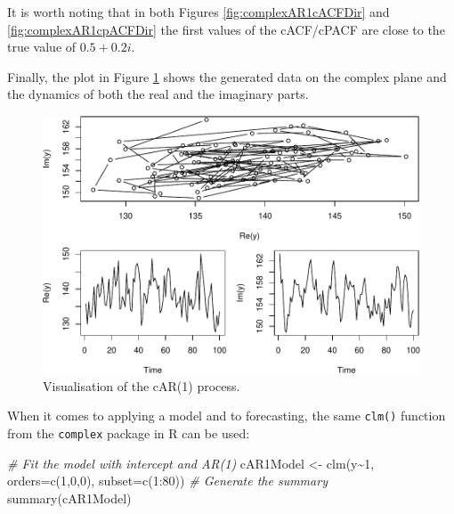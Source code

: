 \documentclass[
]{book}
\newenvironment{Shaded}{\begin{snugshade}}{\end{snugshade}}
\newcommand{\AttributeTok}[1]{\textcolor[rgb]{0.77,0.63,0.00}{#1}}
\newcommand{\CommentTok}[1]{\textcolor[rgb]{0.56,0.35,0.01}{\textit{#1}}}
\newcommand{\DecValTok}[1]{\textcolor[rgb]{0.00,0.00,0.81}{#1}}
\newcommand{\FunctionTok}[1]{\textcolor[rgb]{0.00,0.00,0.00}{#1}}
\newcommand{\NormalTok}[1]{#1}
\newcommand{\OtherTok}[1]{\textcolor[rgb]{0.56,0.35,0.01}{#1}}
\newcommand{\SpecialCharTok}[1]{\textcolor[rgb]{0.00,0.00,0.00}{#1}}
\begin{document}
It is worth noting that in both Figures \ref{fig:complexAR1cACFDir} and \ref{fig:complexAR1cpACFDir} the first values of the cACF/cPACF are close to the true value of \(0.5+0.2i\).

Finally, the plot in Figure \ref{fig:complexAR1Plot} shows the generated data on the complex plane and the dynamics of both the real and the imaginary parts.

\begin{figure}
\centering
\includegraphics{Svetunkov---Svetunkov---Complex-Valued-Econometrics_files/figure-latex/complexAR1Plot-1.pdf}
\caption{\label{fig:complexAR1Plot}Visualisation of the cAR(1) process.}
\end{figure}

When it comes to applying a model and to forecasting, the same \texttt{clm()} function from the \texttt{complex} package in R can be used:

\begin{Shaded}
\begin{Highlighting}[]
\CommentTok{\# Fit the model with intercept and AR(1)}
\NormalTok{cAR1Model }\OtherTok{\textless{}{-}} \FunctionTok{clm}\NormalTok{(y}\SpecialCharTok{\textasciitilde{}}\DecValTok{1}\NormalTok{, }\AttributeTok{orders=}\FunctionTok{c}\NormalTok{(}\DecValTok{1}\NormalTok{,}\DecValTok{0}\NormalTok{,}\DecValTok{0}\NormalTok{), }\AttributeTok{subset=}\FunctionTok{c}\NormalTok{(}\DecValTok{1}\SpecialCharTok{:}\DecValTok{80}\NormalTok{))}
\CommentTok{\# Generate the summary}
\FunctionTok{summary}\NormalTok{(cAR1Model)}
\end{Highlighting}
\end{Shaded}
\end{document}
